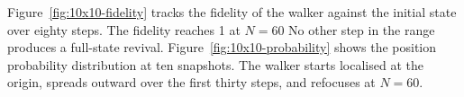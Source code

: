 Figure~\ref{fig:10x10-fidelity} tracks the fidelity of the
walker against the initial state over eighty steps. The
fidelity reaches 1 at $N = 60$ 
No other step in the range produces a full-state revival.
Figure~\ref{fig:10x10-probability} shows the position
probability distribution at ten snapshots. The walker
starts localised at the origin, spreads outward over the
first thirty steps, and refocuses at $N = 60$.

